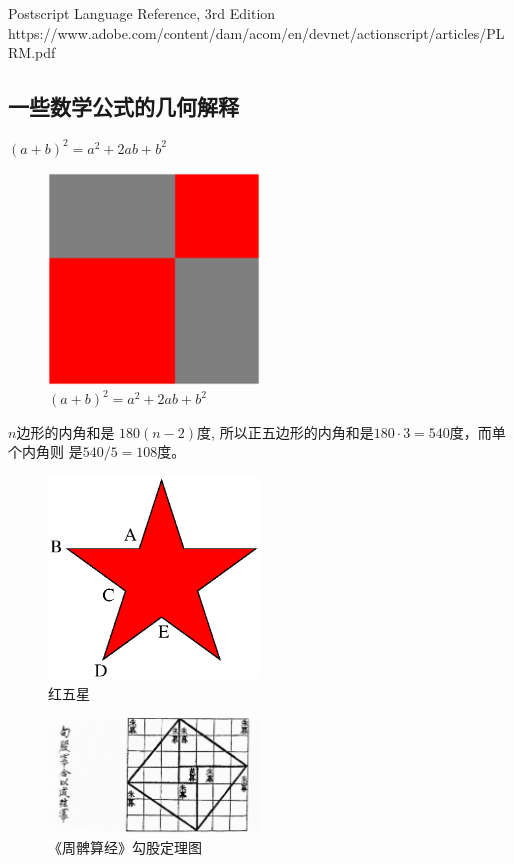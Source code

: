 \documentclass[main.tex]{subfiles}
\begin{document}
	Postscript Language Reference, 3rd Edition \cite{PSLF3}
	https://www.adobe.com/content/dam/acom/en/devnet/actionscript/articles/PLRM.pdf
	
\subsection{一些数学公式的几何解释}
$(a+b)^2 = a^2 + 2ab + b^2$


\begin{figure}[h]
    \centering
    \includegraphics[width=0.5\textwidth]{images/ps.1.1.eps}
    \caption{$(a+b)^2 = a^2 + 2ab + b^2$}
    \label{fig:III.1.1}
\end{figure}

\begin{example} $n$边形的内角和是 $180(n-2)$度, 所以正五边形的内角和是$180\cdot 3 = 540$度，而单个内角则 是$540/5 = 108$度。
\end{example}

\begin{figure}[h]
	\centering
	\includegraphics[width=0.5\textwidth]{images/star.eps}
	\caption{红五星}
	\label{fig:III.1.2}
\end{figure}

\begin{figure}[h]
	\centering
	\includegraphics[width=0.5\textwidth]{images/ps/ch_gougu.jpg}
	\caption{《周髀算经》勾股定理图}
	\label{fig:III.1.3}
\end{figure}
\end{document}
